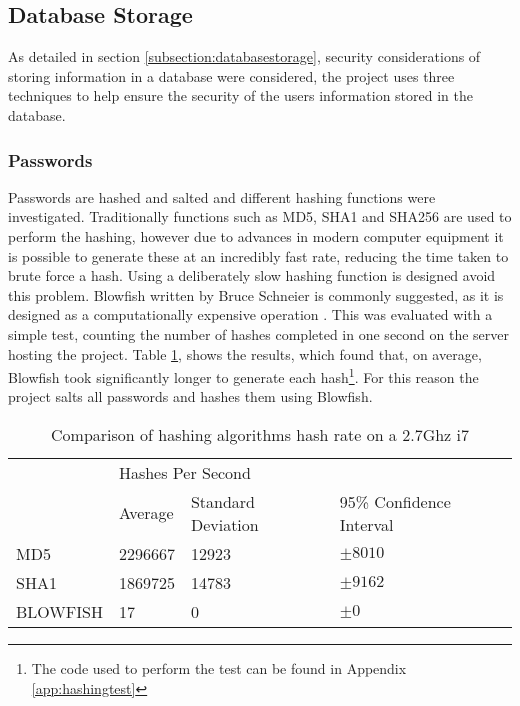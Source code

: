 \subsection{Database Storage}
As detailed in section \ref{subsection:databasestorage}, security considerations of storing information in a database were considered, the project uses three techniques to help ensure the security of the users information stored in the database. 

\subsubsection{Passwords}
Passwords are hashed and salted and different hashing functions were investigated. Traditionally functions such as MD5, SHA1 and SHA256 are used to perform the hashing, however due to advances in modern computer equipment it is possible to generate these at an incredibly fast rate, reducing the time taken to brute force a hash.
%
Using a deliberately slow hashing function is designed avoid this problem. Blowfish written by Bruce Schneier is commonly suggested, as it is designed as a computationally expensive operation \parencite{schneier1994description} . This was evaluated with a simple test, counting the number of hashes completed in one second on the server hosting the project. Table \ref{tab:hashingspeed}, shows the results, which found that, on average, Blowfish took significantly longer to generate each hash\footnote{The code used to perform the test can be found in Appendix \ref{app:hashingtest}}.
%
For this reason the project salts all passwords and hashes them using Blowfish.

\begin{table}[h]
\begin{tabular}{llll}
         & \multicolumn{3}{l}{Hashes Per Second}                   \\
         & Average & Standard Deviation & 95\% Confidence Interval \\
MD5      & \num{2296667} & \num{12923}  & $\pm 8010$   \\
SHA1     & \num{1869725} & \num{14783}  & $\pm 9162$    \\
BLOWFISH & 17            & 0            & $\pm 0$                 \\
\end{tabular}
\caption{Comparison of hashing algorithms hash rate on a 2.7Ghz i7}
\label{tab:hashingspeed}
\end{table}

